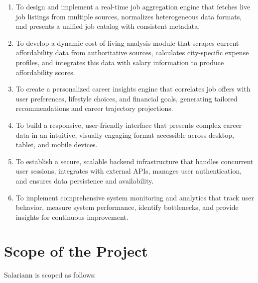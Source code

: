\begin{enumerate}
    \item To design and implement a real-time job aggregation engine that fetches live job listings from multiple sources, normalizes heterogeneous data formats, and presents a unified job catalog with consistent metadata.
    
    \item To develop a dynamic cost-of-living analysis module that scrapes current affordability data from authoritative sources, calculates city-specific expense profiles, and integrates this data with salary information to produce affordability scores.
    
    \item To create a personalized career insights engine that correlates job offers with user preferences, lifestyle choices, and financial goals, generating tailored recommendations and career trajectory projections.
    
    \item To build a responsive, user-friendly interface that presents complex career data in an intuitive, visually engaging format accessible across desktop, tablet, and mobile devices.
    
    \item To establish a secure, scalable backend infrastructure that handles concurrent user sessions, integrates with external APIs, manages user authentication, and ensures data persistence and availability.
    
    \item To implement comprehensive system monitoring and analytics that track user behavior, measure system performance, identify bottlenecks, and provide insights for continuous improvement.
\end{enumerate}

\section{Scope of the Project}

Salariann is scoped as follows:

